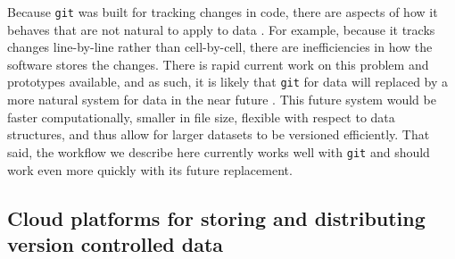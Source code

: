 \documentclass[a4paper,11pt]{article}
\begin{document}
%
Because \texttt{git} was built for tracking changes in code, there are aspects of how it behaves that are not natural to apply to  data \cite{Perkel-2016}.  For example, because it tracks changes line-by-line rather than cell-by-cell, there are inefficiencies in how the software stores the changes.
There is rapid current work on this problem and prototypes available, and as such, it is likely that \texttt{git} for data will replaced by a more natural system for data in the near future  \citep{Fli, Dat}.  This future system would be faster computationally, smaller in file size, flexible with respect to data structures, and thus allow for larger datasets to be versioned efficiently.  That said, the workflow we describe here currently works well with \texttt{git} and should work even more quickly with its future replacement.

\subsection{Cloud platforms for storing and distributing version controlled data}
\end{document}
